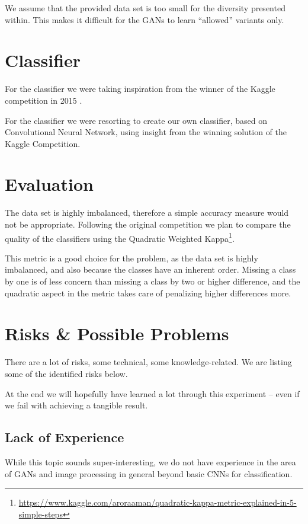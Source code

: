\documentclass[sigconf,nonacm]{acmart}
\begin{document}
We assume that the provided data set is too
small for the diversity presented within.
This makes it difficult for the GANs to learn ``allowed''
variants only.

\section{Classifier}

For the classifier we were taking inspiration from the winner of the
Kaggle competition in 2015 \cite{kagglewinner}.

For the classifier we were resorting to create our own classifier, based
on Convolutional Neural Network, using insight from the winning solution
\cite{kagglewinner}
of the Kaggle Competition.

\section{Evaluation}

The data set is highly imbalanced, therefore a simple
accuracy measure would not be appropriate.
Following the original
competition we plan to compare the quality of the classifiers
using the Quadratic Weighted
Kappa\footnote{\url{https://www.kaggle.com/aroraaman/quadratic-kappa-metric-explained-in-5-simple-steps}}.

This metric is a good choice for the problem, as the data set
is highly imbalanced, and also because the classes have an
inherent order.
Missing a class by one is of less concern than missing a class
by two or higher difference, and the quadratic
aspect in the metric takes care of penalizing higher differences
more.

\section{Risks \& Possible Problems}

There are a lot of risks, some technical, some knowledge-related.
We are listing some of the identified risks below.

At the end we will hopefully have learned a lot through this
experiment -- even if we fail with achieving a tangible result.

\subsection{Lack of Experience}

While this topic sounds super-interesting, we do not have
experience in the area of GANs and image processing in general
beyond basic CNNs for classification.
\end{document}
